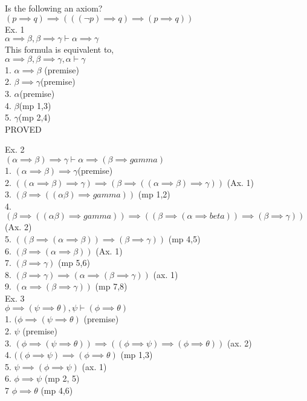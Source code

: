 \documentclass[12pt,oneside,fleqn]{article}
\theoremstyle{definition}
\begin{document}
Is the following an axiom? \\
$(p \implies q) \implies (((\neg p) \implies q) \implies (p \implies q))$ \\

Ex. 1 \\
${ \alpha \implies \beta , \beta \implies \gamma} \vdash \alpha \implies \gamma$ \\
This formula is equivalent to, \\
${\alpha \implies \beta, \beta \implies \gamma, \alpha} \vdash \gamma$ \\
1. $\alpha \implies \beta$ (premise) \\
2. $\beta \implies \gamma $(premise) \\
3. $\alpha $(premise) \\
4. $\beta $(mp 1,3) \\
5. $\gamma $(mp 2,4) \\
PROVED

Ex. 2 \\
${ (\alpha \implies \beta) \implies \gamma} \vdash \alpha \implies (\beta \implies gamma)$ \\
1. $(\alpha \implies \beta) \implies \gamma $(premise) \\
2. $((\alpha \implies \beta) \implies \gamma) \implies (\beta \implies ((\alpha \implies \beta) \implies \gamma))$ (Ax. 1) \\
3. $(\beta \implies (( \alpha \beta) \implies gamma))$ (mp 1,2) \\
4. $(\beta \implies (( \alpha \beta) \implies gamma)) \implies (( \beta \implies (\alpha \implies beta)) \implies (\beta \implies \gamma))$ (Ax. 2) \\
5. $((\beta \implies (\alpha \implies \beta)) \implies (\beta \implies \gamma))$ (mp 4,5) \\
6. $(\beta \implies (\alpha \implies \beta))$ (Ax. 1) \\
7. $(\beta \implies \gamma)$ (mp 5,6) \\
8. $(\beta \implies \gamma) \implies (\alpha \implies (\beta \implies \gamma))$ (ax. 1) \\
9. $(\alpha \implies (\beta \implies \gamma))$ (mp 7,8) \\

Ex. 3 \\
${ \phi \implies (\psi \implies \theta), \psi} \vdash (\phi \implies \theta)$ \\
1. $(\phi \implies (\psi \implies \theta)$ (premise) \\
2. $\psi$ (premise) \\
3. $(\phi \implies (\psi \implies \theta) ) \implies ((\phi \implies \psi) \implies (\phi \implies \theta))$ (ax. 2) \\
4. $((\phi \implies \psi) \implies (\phi \implies \theta)$ (mp 1,3) \\
5. $\psi \implies (\phi \implies \psi)$ (ax. 1) \\
6. $\phi \implies \psi$ (mp 2, 5) \\
7 $\phi \implies \theta$ (mp 4,6) \\
\end{document}
